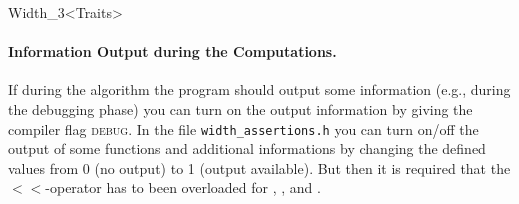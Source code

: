 \begin{ccRefClass}{Width_3<Traits>}
\begin{ccAdvanced}
\paragraph{Information Output during the Computations.} 

If during the algorithm the program should output some information
(e.g., during the debugging phase) you can turn on the output
information by giving the compiler flag \textsc{debug}. In the file
\texttt{width\_assertions.h} you can turn on/off the output of some
functions and additional informations by changing the defined values
from 0 (no output) to 1 (output available). But then it is required
that the $<\!<$-operator has to been overloaded for ,
,  and .

\end{ccAdvanced}

\ccExample
{}



\ccRestoreThreeColumns

\end{ccRefClass}

